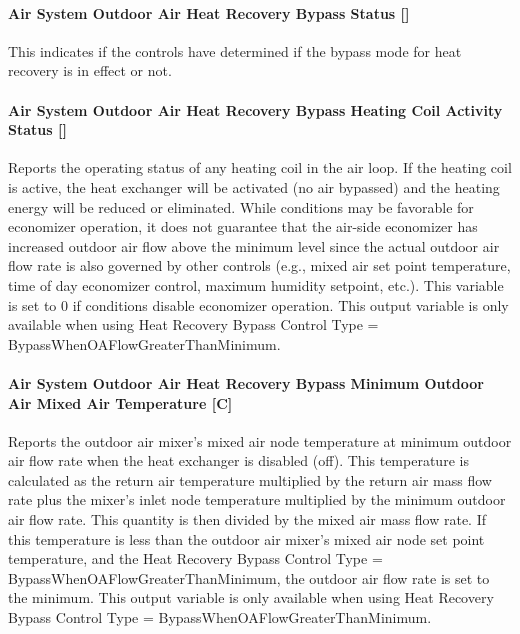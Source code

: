 \paragraph{Air System Outdoor Air Heat Recovery Bypass Status {[]}}\label{air-system-outdoor-air-heat-recovery-bypass-status}

This indicates if the controls have determined if the bypass mode for heat recovery is in effect or not.

\paragraph{Air System Outdoor Air Heat Recovery Bypass Heating Coil Activity Status {[]}}\label{air-system-outdoor-air-heat-recovery-bypass-heating-coil-activity-status}

Reports the operating status of any heating coil in the air loop. If the heating coil is active, the heat exchanger will be activated (no air bypassed) and the heating energy will be reduced or eliminated. While conditions may be favorable for economizer operation, it does not guarantee that the air-side economizer has increased outdoor air flow above the minimum level since the actual outdoor air flow rate is also governed by other controls (e.g., mixed air set point temperature, time of day economizer control, maximum humidity setpoint, etc.). This variable is set to 0 if conditions disable economizer operation. This output variable is only available when using Heat Recovery Bypass Control Type = BypassWhenOAFlowGreaterThanMinimum.

\paragraph{Air System Outdoor Air Heat Recovery Bypass Minimum Outdoor Air Mixed Air Temperature {[}C{]}}\label{air-system-outdoor-air-heat-recovery-bypass-minimum-outdoor-air-mixed-air-temperature-c}

Reports the outdoor air mixer's mixed air node temperature at minimum outdoor air flow rate when the heat exchanger is disabled (off). This temperature is calculated as the return air temperature multiplied by the return air mass flow rate plus the mixer's inlet node temperature multiplied by the minimum outdoor air flow rate. This quantity is then divided by the mixed air mass flow rate. If this temperature is less than the outdoor air mixer's mixed air node set point temperature, and the Heat Recovery Bypass Control Type = BypassWhenOAFlowGreaterThanMinimum, the outdoor air flow rate is set to the minimum. This output variable is only available when using Heat Recovery Bypass Control Type = BypassWhenOAFlowGreaterThanMinimum.


